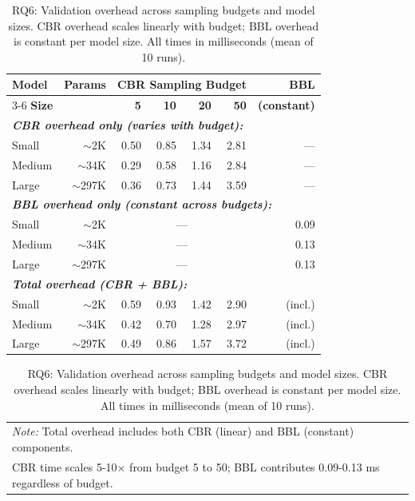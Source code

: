 \begin{table}[t]
\centering
\caption{RQ6: Validation overhead across sampling budgets and model sizes. CBR overhead scales linearly with budget; BBL overhead is constant per model size. All times in milliseconds (mean of 10 runs).}
\label{tab:rq6-overhead-full}
\small
\setlength{\tabcolsep}{5pt}
\begin{tabular}{l@{\hspace{8pt}}r@{\hspace{12pt}}rrrr@{\hspace{12pt}}r}
\toprule
\textbf{Model} & \textbf{Params} & \multicolumn{4}{c}{\textbf{CBR Sampling Budget}} & \textbf{BBL} \\
\cmidrule(lr){3-6}
\textbf{Size} & & \textbf{5} & \textbf{10} & \textbf{20} & \textbf{50} & \textbf{(constant)} \\
\midrule
\multicolumn{7}{l}{\textit{\textbf{CBR overhead only (varies with budget):}}} \\
Small   & $\sim$2K   & 0.50 & 0.85 & 1.34 & 2.81 & --- \\
Medium  & $\sim$34K  & 0.29 & 0.58 & 1.16 & 2.84 & --- \\
Large   & $\sim$297K & 0.36 & 0.73 & 1.44 & 3.59 & --- \\
\midrule
\multicolumn{7}{l}{\textit{\textbf{BBL overhead only (constant across budgets):}}} \\
Small   & $\sim$2K   & \multicolumn{4}{c}{---} & 0.09 \\
Medium  & $\sim$34K  & \multicolumn{4}{c}{---} & 0.13 \\
Large   & $\sim$297K & \multicolumn{4}{c}{---} & 0.13 \\
\midrule
\multicolumn{7}{l}{\textit{\textbf{Total overhead (CBR + BBL):}}} \\
Small   & $\sim$2K   & 0.59 & 0.93 & 1.42 & 2.90 & (incl.) \\
Medium  & $\sim$34K  & 0.42 & 0.70 & 1.28 & 2.97 & (incl.) \\
Large   & $\sim$297K & 0.49 & 0.86 & 1.57 & 3.72 & (incl.) \\
\bottomrule
\end{tabular}
\vspace{2mm}
\begin{tabular}{@{}l@{}}
\footnotesize
\textit{Note:} Total overhead includes both CBR (linear) and BBL (constant) components. \\
\footnotesize
CBR time scales 5-10× from budget 5 to 50; BBL contributes 0.09-0.13 ms regardless of budget.
\end{tabular}
\end{table}
